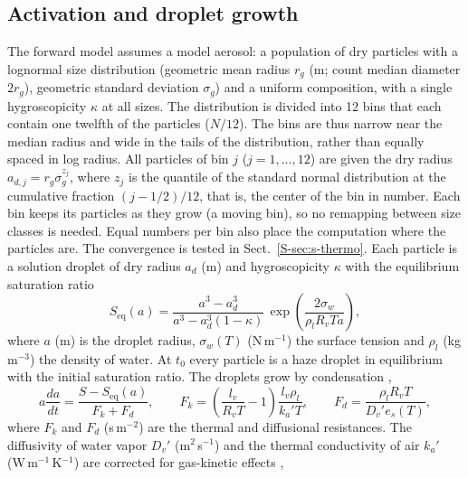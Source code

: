 \documentclass[preprint,review,12pt,authoryear]{elsarticle}
\begin{document}
\subsection{Activation and droplet growth}
\label{sec:growth}
The forward model assumes a model aerosol: a population of dry particles with a lognormal size
distribution (geometric mean radius $r_g$ (m;
count median diameter $2r_g$),
geometric standard deviation $\sigma_g$) and a uniform composition, with a single hygroscopicity
$\kappa$ at all sizes.
The distribution is divided into 12 bins that each contain one twelfth of the particles ($N/12$).
The bins are thus narrow near the median radius and wide in the tails of the distribution, rather than
equally spaced in log radius.
All particles of bin $j$ ($j = 1, \dots, 12$) are given the dry radius
$a_{d,j} = r_g \sigma_g^{z_j}$, where $z_j$ is the quantile of the standard normal distribution at
the cumulative fraction $(j - 1/2)/12$, that is, the center of the bin in number.
Each bin keeps its particles as they grow (a moving bin), so no remapping between size classes is needed.
Equal numbers per bin also place the computation where the particles are. The convergence is tested in
Sect.~\ref{S-sec:s-thermo}.
Each particle is a solution droplet of dry radius $a_d$ (m) and hygroscopicity $\kappa$
with the equilibrium saturation ratio \citep{petters2007single}
\begin{equation}
S_\mathrm{eq}(a) = \frac{a^3 - a_d^3}{a^3 - a_d^3(1-\kappa)}\,
\exp\!\left(\frac{2\sigma_w}{\rho_l R_v T a}\right),
\label{eq:koehler}
\end{equation}
where $a$ (m) is the droplet radius, $\sigma_w(T)$ (N\,m$^{-1}$) the surface tension and $\rho_l$
(kg\,m$^{-3}$) the density of water. At $t_0$ every particle is a haze droplet in equilibrium with the
initial saturation ratio.
The droplets grow by condensation
\citep[Eq.~13-28 with $S_\mathrm{eq}$ in place of $1 + y$]{pruppacher1997microphysics},
\begin{equation}
a\frac{da}{dt} = \frac{S - S_\mathrm{eq}(a)}{F_k + F_d},\qquad
F_k = \left(\frac{l_v}{R_v T} - 1\right)\frac{l_v \rho_l}{k_a' T},\qquad
F_d = \frac{\rho_l R_v T}{D_v' e_s(T)},
\label{eq:growth}
\end{equation}
where $F_k$ and $F_d$ (s\,m$^{-2}$) are the thermal and diffusional resistances. The diffusivity of
water vapor $D_v'$ (m$^2$\,s$^{-1}$) and the thermal conductivity of air $k_a'$
(W\,m$^{-1}$\,K$^{-1}$) are corrected for gas-kinetic effects \citep[Eqs.~13-14 and
13-20 with the vapor and thermal jump distances set to zero]{pruppacher1997microphysics},
\end{document}
